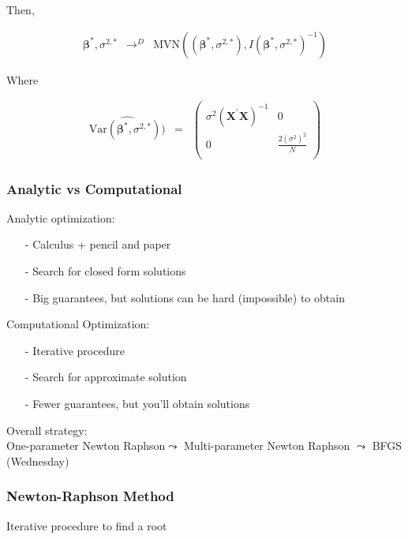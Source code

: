 \documentclass{beamer}
\begin{document}
\begin{frame}


Then,

 \begin{eqnarray}
 \boldsymbol{\beta}^{*},\sigma^{2, *} & \rightarrow^{D} & \text{MVN}((\boldsymbol{\beta}^{*}, \sigma^{2,*}), I(\boldsymbol{\beta}^{*}, \sigma^{2,*})^{-1} ) \nonumber
 \end{eqnarray}

Where

\begin{eqnarray}
\widehat{\text{Var}(\boldsymbol{\beta}^{*}, \sigma^{2,*}) )} & = & \begin{pmatrix} \sigma^2 (\boldsymbol{X}^{'}\boldsymbol{X})^{-1} & 0 \\
0 & \frac{2 (\sigma^2)^2}{N} \\
\end{pmatrix} \nonumber
\end{eqnarray}

\end{frame}


\begin{frame}
\frametitle{Analytic vs Computational}

Analytic optimization:
\begin{itemize}
\item[-] Calculus + pencil and paper
\item[-] Search for closed form solutions
\item[-] Big guarantees, but solutions can be hard (impossible) to obtain
\end{itemize}

Computational Optimization:
\begin{itemize}
\item[-] Iterative procedure
\item[-] Search for \alert{approximate} solution
\item[-] Fewer guarantees, but you'll obtain solutions
\end{itemize}

Overall strategy:\\
One-parameter Newton Raphson$\leadsto$ Multi-parameter Newton Raphson $\leadsto$ BFGS (Wednesday)

\end{frame}


\begin{frame}
\frametitle{Newton-Raphson Method}

Iterative procedure to find a \alert{root} \\ \pause
{} \pause \\
 \pause \\




\end{frame}
\end{document}
